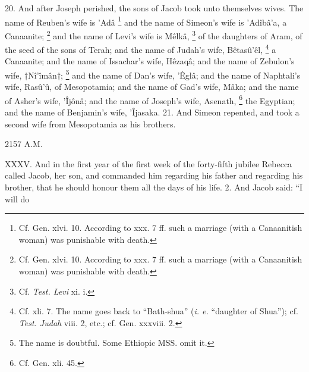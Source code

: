 20. And after Joseph perished, the sons of Jacob took unto themselves wives. The name of Reuben's wife is ’Adâ \footnote{Cf. Gen. xlvi. 10. According to xxx. 7 ff. such a marriage (with a Canaanitish woman) was punishable with death.} and the name of Simeon's wife is ’Adîbâ’a, a Canaanite; \footnote{Cf. Gen. xlvi. 10. According to xxx. 7 ff. such a marriage (with a Canaanitish woman) was punishable with death.} and the name of Levi's wife is Mêlkâ, \footnote{Cf. \emph{Test. Levi} xi. i.} of the daughters of Aram, of the seed of the sons of Terah; and the name of Judah's wife, Bêtasû’êl, \footnote{Cf. xli. 7. The name goes back to ``Bath-shua'' (\emph{i. e.} ``daughter of Shua''); cf. \emph{Test. Judah} viii. 2, etc.; cf. Gen. xxxviii. 2.} a Canaanite; and the name of Issachar's wife, Hêzaqâ; and the name of Zebulon's wife, †Nî’îmân†; \footnote{The name is doubtful. Some Ethiopic MSS. omit it.} and the name of Dan's wife, ’Êglâ; and the name of Naphtali's wife, Rasû’û, of Mesopotamia; and the name of Gad's wife, Mâka; and the name of Asher's wife, ’Îjônâ; and the name of Joseph's wife, Asenath, \footnote{Cf. Gen. xli. 45.} the Egyptian; and the name of Benjamin's wife, ’Îjasaka. 21. And Simeon repented, and took a second wife from Mesopotamia as his brothers.


2157 A.M.

XXXV. And in the first year of the first week of the forty-fifth jubilee Rebecca called Jacob, her son, and commanded him regarding his father and regarding his brother, that he should honour them all the days of his life. 2. And Jacob said: ``I will do

